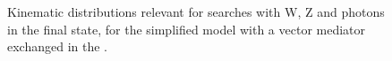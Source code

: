 \begin{figure}[h!]
{}    
\hfill
{}    
\caption{Kinematic distributions relevant for searches with W, Z and photons in the final state, 
for the simplified model
       with a vector mediator exchanged in the \schannel.}
\label{fig:DMV_EW_kinematics_SVMed}
\end{figure}
